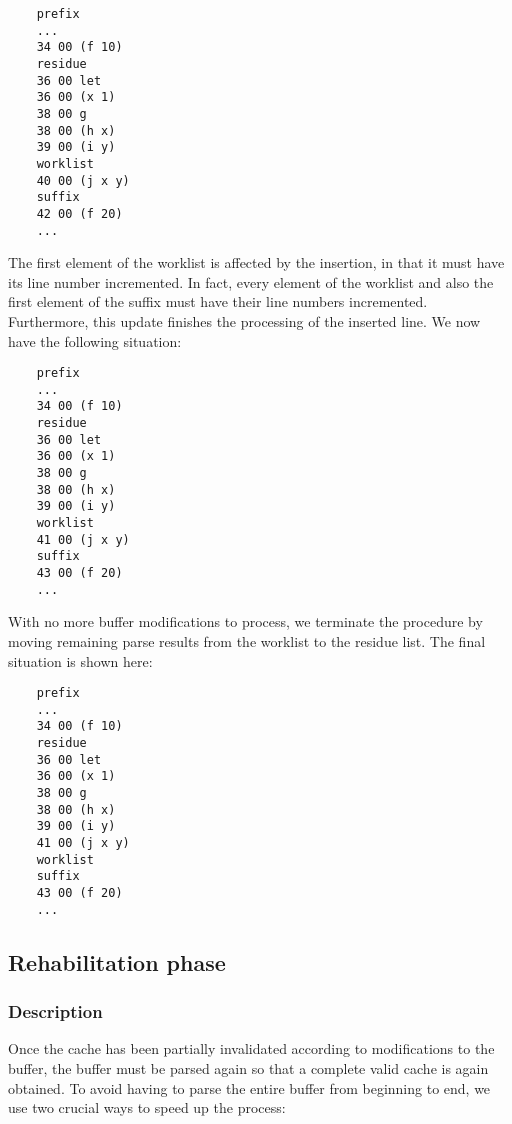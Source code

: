 {\small\begin{verbatim}
    prefix
    ...
    34 00 (f 10)
    residue
    36 00 let
    36 00 (x 1)
    38 00 g
    38 00 (h x)
    39 00 (i y)
    worklist
    40 00 (j x y)
    suffix
    42 00 (f 20)
    ...
\end{verbatim}}

The first element of the worklist is affected by the insertion, in
that it must have its line number incremented.  In fact, every element
of the worklist and also the first element of the suffix must have
their line numbers incremented.  Furthermore, this update finishes the
processing of the inserted line.  We now have the following situation:

{\small\begin{verbatim}
    prefix
    ...
    34 00 (f 10)
    residue
    36 00 let
    36 00 (x 1)
    38 00 g
    38 00 (h x)
    39 00 (i y)
    worklist
    41 00 (j x y)
    suffix
    43 00 (f 20)
    ...
\end{verbatim}}

With no more buffer modifications to process, we terminate the
procedure by moving remaining parse results from the worklist to the
residue list.  The final situation is shown here:

{\small\begin{verbatim}
    prefix
    ...
    34 00 (f 10)
    residue
    36 00 let
    36 00 (x 1)
    38 00 g
    38 00 (h x)
    39 00 (i y)
    41 00 (j x y)
    worklist
    suffix
    43 00 (f 20)
    ...
\end{verbatim}}

\subsection{Rehabilitation phase}

\subsubsection{Description}

Once the cache has been partially invalidated according to
modifications to the buffer, the buffer must be parsed again so that a
complete valid cache is again obtained.  To avoid having to parse the
entire buffer from beginning to end, we use two crucial ways to speed
up the process:

